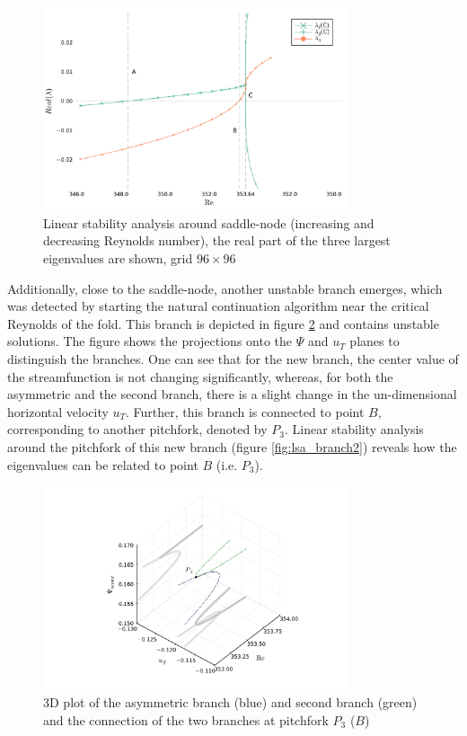 \begin{figure}[h]
  \centering
  \includegraphics[width=0.8\textwidth]{figs/lsa_sn96x96.pdf}
  \caption{Linear stability analysis around saddle-node (increasing and
    decreasing Reynolds number), the real part of the three largest eigenvalues
    are shown, grid $96 \times 96$} 
  \label{fig:lsa}
\end{figure}

Additionally, close to the saddle-node, another unstable branch emerges, which
was detected by starting the natural continuation algorithm near the critical
Reynolds of the fold. This branch is depicted in figure \ref{fig:branch2} and
contains unstable solutions. The figure shows the projections onto the $\Psi$
and $u_T$ planes to distinguish the branches. One can see that for the new
branch, the center value of the streamfunction is not changing significantly,
whereas, for both the asymmetric and the second branch, there is a slight
change in the un-dimensional horizontal velocity $u_T$. Further, this branch is
connected to point $B$, corresponding to another pitchfork, denoted by $P_3$.
Linear stability analysis around the pitchfork of this new branch (figure
\ref{fig:lsa_branch2}) reveals how the eigenvalues can be related to point $B$
(i.e. $P_3$).

\begin{figure}[h!]
  \centering
  \includegraphics[width=0.8\textwidth]{figs/branch2_64x64.pdf}
  \caption{3D plot of the asymmetric branch (blue) and second branch (green) and the
    connection of the two branches at pitchfork $P_3$ ($B$)}
  \label{fig:branch2}
\end{figure}

